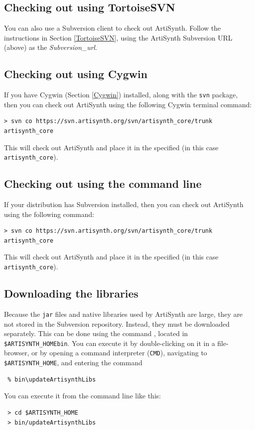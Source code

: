 \ifWindows
\subsection{Checking out using TortoiseSVN}
\label{TortoiseSVNCheckout}

You can also use a Subversion client to check out ArtiSynth. Follow
the instructions in Section \ref{TortoiseSVN}, using the ArtiSynth
Subversion URL (above) as the {\it Subversion\_url}.

\subsection{Checking out using Cygwin}
\label{ArtiSynthCygwinCheckout}

If you have Cygwin (Section \ref{Cygwin}) installed, along
with the {\tt svn} package, then you can check out ArtiSynth using the
following Cygwin terminal command:

\begin{lstlisting}
> svn co https://svn.artisynth.org/svn/artisynth_core/trunk artisynth_core
\end{lstlisting}

This will check out ArtiSynth and place it in the specified \directory 
(in this case {\tt artisynth\_core}).
\else
\subsection{Checking out using the command line}
\label{ArtiSynthCygwinCheckout}

If your \SYSTEM distribution has Subversion installed, then you can
check out ArtiSynth using the following command:

\begin{lstlisting}
> svn co https://svn.artisynth.org/svn/artisynth_core/trunk artisynth_core
\end{lstlisting}

This will check out ArtiSynth and place it in the specified \directory 
(in this case {\tt artisynth\_core}).
\fi

\subsection{Downloading the libraries}
\label{DownloadingLibraries}

Because the {\tt jar} files and native libraries used by ArtiSynth
are large, they are not stored in the Subversion repository.
Instead, they must be downloaded separately. This can be
done using the command \updateArtisynthLibs, located
in {\tt \$ARTISYNTH\_HOME\SEP bin}.
\ifWindows
You can execute it by double-clicking on it in a file-browser, or
by opening a command interpreter ({\tt CMD}), navigating
to {\tt \$ARTISYNTH\_HOME}, and entering the command
\begin{verbatim}
 % bin\updateArtisynthLibs
\end{verbatim}
\else
You can execute it from the command line like this:
\begin{verbatim}
 > cd $ARTISYNTH_HOME
 > bin/updateArtisynthLibs
\end{verbatim}
\fi

